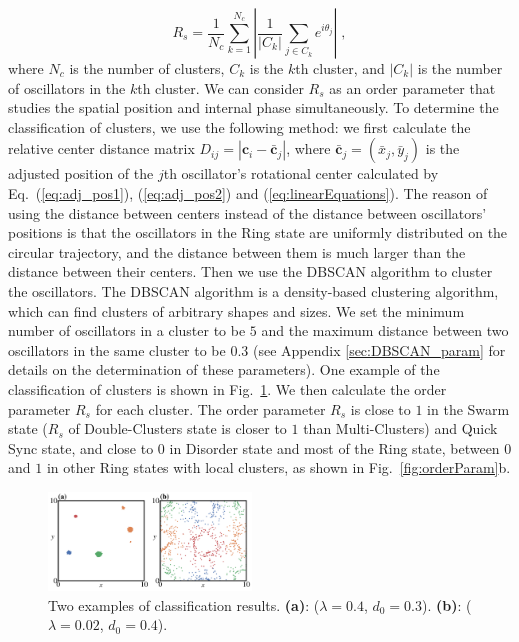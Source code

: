 \documentclass[%
 aip,
 amsmath,amssymb,
 reprint,%
]{revtex4-1}
\begin{document}
\begin{equation}
    R_s=\frac{1}{N_c}\sum_{k=1}^{N_c}{\left| \frac{1}{\left| C_k \right|}\sum_{j\in C_k}{e^{i\theta _j}} \right|}\;,
\end{equation}
where $N_c$ is the number of clusters, $C_k$ is the $k$th cluster, and $\left| C_k \right|$ is the number of oscillators in the $k$th cluster. We can consider $R_s$ as an order parameter that studies the spatial position and internal phase simultaneously.
To determine the classification of clusters, we use the following method: we first calculate the relative center distance matrix $D_{ij}=\left| \mathbf{c}_i-\bar{\mathbf{c}}_j \right|$, where $\bar{\mathbf{c}}_j=\left( \bar{x}_j,\bar{y}_j \right)$ is the adjusted position of the $j$th oscillator's rotational center calculated by Eq.~(\ref{eq:adj_pos1}), (\ref{eq:adj_pos2}) and (\ref{eq:linearEquations}). 
The reason of using the distance between centers instead of the distance between oscillators' positions is that the oscillators in the Ring state are uniformly distributed on the circular trajectory, and the distance between them is much larger than the distance between their centers.
Then we use the DBSCAN algorithm to cluster the oscillators. The DBSCAN algorithm is a density-based clustering algorithm, which can find clusters of arbitrary shapes and sizes. We set the minimum number of oscillators in a cluster to be $5$ and the maximum distance between two oscillators in the same cluster to be $0.3$ (see Appendix \ref{sec:DBSCAN_param} for details on the determination of these parameters). 
One example of the classification of clusters is shown in Fig.~\ref{fig:classifyResult}.
We then calculate the order parameter $R_s$ for each cluster. The order parameter $R_s$ is close to $1$ in the Swarm state ($R_s$ of Double-Clusters state is closer to $1$ than Multi-Clusters) and Quick Sync state, and close to $0$ in Disorder state and most of the Ring state, between $0$ and $1$ in other Ring states with local clusters, as shown in Fig.~\ref{fig:orderParam}b.

\begin{figure}[b]
    \includegraphics[width=0.48\textwidth]{./figs/classifyResult.pdf}
    \caption{
        \label{fig:classifyResult} Two examples of classification results. \textbf{(a)}: ($\lambda=0.4$, $d_0=0.3$). \textbf{(b)}: ($\lambda=0.02$, $d_0=0.4$).
    }
\end{figure}
\end{document}

